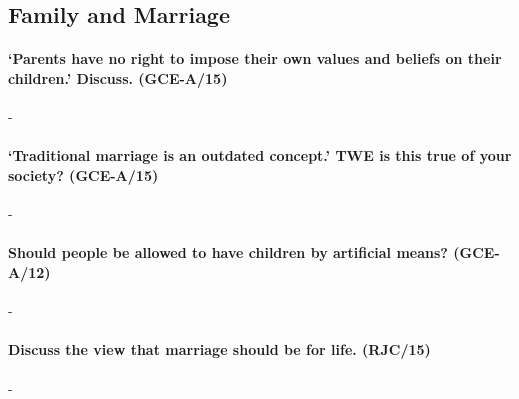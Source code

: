 \documentclass[../../main]{subfiles}
\begin{document}
\subsection{Family and Marriage}

\paragraph{`Parents have no right to impose their own values and beliefs on their children.' Discuss. (GCE-A/15)}-

\paragraph{`Traditional marriage is an outdated concept.' TWE is this true of your society? (GCE-A/15)}-

\paragraph{Should people be allowed to have children by artificial means? (GCE-A/12)}-

\paragraph{Discuss the view that marriage should be for life. (RJC/15)}-
\end{document}
